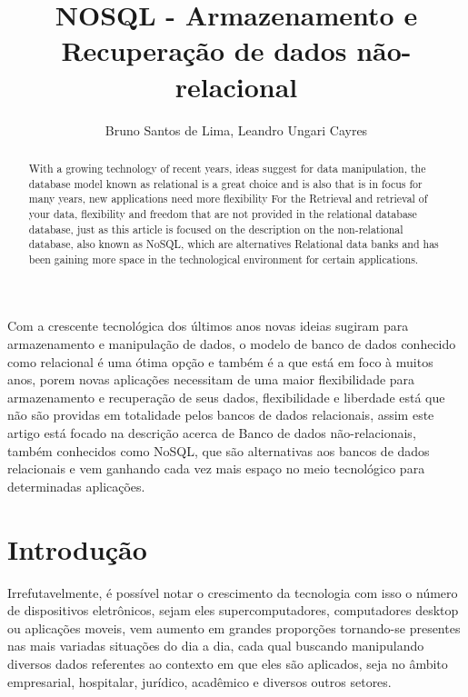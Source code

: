 \documentclass[12pt]{article}
\title{NOSQL - Armazenamento e Recuperação de dados não-relacional}
\author{Bruno Santos de Lima\inst{1}, Leandro Ungari Cayres\inst{1} }
\begin{document}
 

\maketitle

\begin{abstract}

With a growing technology of recent years, ideas suggest for data manipulation, the database model known as relational is a great choice and is also that is in focus for many years, new applications need more flexibility For the Retrieval and retrieval of your data, flexibility and freedom that are not provided in the relational database database, just as this article is focused on the description on the non-relational database, also known as NoSQL, which are alternatives Relational data banks and has been gaining more space in the technological environment for certain applications.

\end{abstract}
     
\begin{resumo} 

Com a crescente tecnológica dos últimos anos novas ideias sugiram para armazenamento e manipulação de dados, o modelo de banco de dados conhecido como relacional é uma ótima opção e também é a que está em foco à muitos anos, porem novas aplicações necessitam de uma maior flexibilidade para armazenamento e recuperação de seus dados, flexibilidade e liberdade está que não são providas em totalidade pelos bancos de dados relacionais, assim este artigo está focado na descrição acerca de Banco de dados não-relacionais, também conhecidos como NoSQL, que são alternativas aos bancos de dados relacionais e vem ganhando cada vez mais espaço no meio tecnológico para determinadas aplicações.

\end{resumo}

\section{Introdução}
\label{sec:intro}

Irrefutavelmente, é possível notar o crescimento da tecnologia com isso o número de dispositivos eletrônicos, sejam eles supercomputadores, computadores desktop ou aplicações moveis, vem aumento em grandes proporções tornando-se presentes nas mais variadas situações do dia a dia, cada qual buscando manipulando diversos dados referentes ao contexto em que eles são aplicados, seja no âmbito empresarial, hospitalar, jurídico, acadêmico e diversos outros setores.
\end{document}
